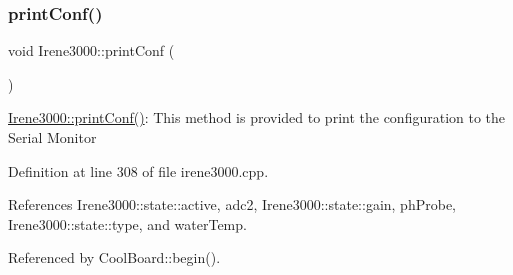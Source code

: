 \subsubsection{\texorpdfstring{print\+Conf()}{printConf()}}
{\footnotesize\ttfamily void Irene3000\+::print\+Conf (\begin{DoxyParamCaption}{ }\end{DoxyParamCaption})}

\hyperlink{classIrene3000_a7bc2414100b5e19eacc6630fa34b2654}{Irene3000\+::print\+Conf()}\+: This method is provided to print the configuration to the Serial Monitor 

Definition at line 308 of file irene3000.\+cpp.



References Irene3000\+::state\+::active, adc2, Irene3000\+::state\+::gain, ph\+Probe, Irene3000\+::state\+::type, and water\+Temp.



Referenced by Cool\+Board\+::begin().


